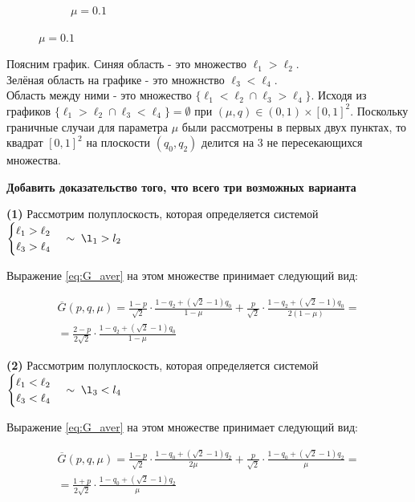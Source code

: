 \begin{flushleft}
\begin{figure}[H]
\begin{subfigure}[b]{0.22 \textwidth}
         	\caption{$\mu=0.1$}
         	\label{fig:five over x}
     	\end{subfigure}
	\end{figure}
	
	Поясним график. Синяя область - это множество $\ell_1 > \ell_2$.\\
	Зелёная область на графике - это множнство $\ell_3 < \ell_4$.\\
	Область между ними - это множество $\{\ell_1<\ell_2 \cap \ell_3 > \ell_4\}$.
	Исходя из графиков $\{\ell_1>\ell_2 \cap \ell_3 < \ell_4\} = \emptyset$ 
	при $(\mu, q) \in (0, 1) \times [0, 1]^2$.
	Поскольку граничные случаи для параметра $\mu$ были рассмотрены в первых
	двух пунктах, то квадрат $[0,1]^2$ на плоскости $(q_0,q_2)$ делится на 3 не 
	пересекающихся множества.
	
	\textbf{Добавить доказательство того, что всего три возможных варианта}

	\textbf{(1)} Рассмотрим полуплоскость, которая определяется системой
	$\begin{cases}
			\ell_1 > \ell_2 \\
			\ell_3 > \ell_4
	\end{cases} \sim \; \l_1 > l_2$
	
	Выражение \eqref{eq:G_aver} на этом множестве принимает следующий вид:
	
	\begin{gather*}
		\overline G(p,q,\mu)=
		\frac{1-p}{\sqrt{2}} \cdot \frac{1-q_2+(\sqrt{2}-1)q_0}{1-\mu} + 
		\frac{p}{\sqrt{2}} \cdot \frac{1-q_2+(\sqrt{2}-1)q_0}{2(1-\mu)} = \\
		=\frac{2-p}{2\sqrt{2}}\cdot\frac{1-q_2+(\sqrt{2}-1)q_0}{1-\mu}		
	\end{gather*}
	
	\textbf{(2)} Рассмотрим полуплоскость, которая определяется системой
	$\begin{cases}
			\ell_1 < \ell_2 \\
			\ell_3 < \ell_4
	\end{cases} \sim \; \l_3 < l_4$
	
	Выражение \eqref{eq:G_aver} на этом множестве принимает следующий вид:
	
	\begin{gather*}
		\overline G(p,q,\mu)=
		\frac{1-p}{\sqrt{2}} \cdot \frac{1-q_0+(\sqrt{2}-1)q_2}{2\mu} + 
		\frac{p}{\sqrt{2}} \cdot \frac{1-q_0+(\sqrt{2}-1)q_2}{\mu} = \\
		=\frac{1+p}{2\sqrt{2}}\cdot\frac{1-q_0+(\sqrt{2}-1)q_2}{\mu}		
	\end{gather*}
	

\end{flushleft}
